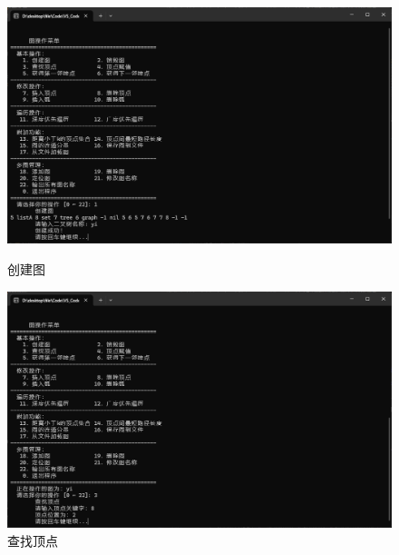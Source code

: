 \documentclass[supercite]{Experimental_Report}
\theoremstyle{definition}
\begin{document}
\begin{figure}[htb]
	\begin{center}
		\includegraphics[scale=0.30]{images/2-2.jpg}
		\caption{创建图}
		\label{fig2-2}
	\end{center}


	\begin{center}
		\includegraphics[scale=0.30]{images/2-3.jpg}
		\caption{查找顶点}
		\label{fig2-3}
	\end{center}
\end{figure}
\end{document}

